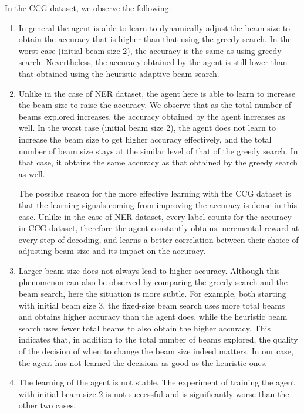 \documentclass[11pt,a4paper]{article}
\begin{document}
In the CCG dataset, we observe the following:
\begin{enumerate}
\item In general the agent is able to learn to dynamically adjust the beam size to obtain the accuracy that is higher than that using the greedy search. In the worst case (initial beam size 2), the accuracy is the same as using greedy search. Nevertheless, the accuracy obtained by the agent is still lower than that obtained using the heuristic adaptive beam search.
\item Unlike in the case of NER dataset, the agent here is able to learn to increase the beam size to raise the accuracy. We observe that as the total number of beams explored increases, the accuracy obtained by the agent increases as well. In the worst case (initial beam size 2), the agent does not learn to increase the beam size to get higher accuracy effectively, and the total number of beam size stays at the similar level of that of the greedy search. In that case, it obtains the same accuracy as that obtained by the greedy search as well.

The possible reason for the more effective learning with the CCG dataset is that the learning signals coming from improving the accuracy is dense in this case. Unlike in the case of NER dataset, every label counts for the accuracy in CCG dataset, therefore the agent constantly obtains incremental reward at every step of decoding, and learns a better correlation between their choice of adjusting beam size and its impact on the accuracy.

\item Larger beam size does not always lead to higher accuracy. Although this phenomenon can also be observed by comparing the greedy search and the beam search, here the situation is more subtle. For example, both starting with initial beam size 3, the fixed-size beam search uses more total beams and obtains higher accuracy than the agent does, while the heuristic beam search uses fewer total beams to also obtain the higher accuracy. This indicates that, in addition to the total number of beams explored, the quality of the decision of when to change the beam size indeed matters. In our case, the agent has not learned the decisions as good as the heuristic ones.

\item The learning of the agent is not stable. The experiment of training the agent with initial beam size 2 is not successful and is significantly worse than the other two cases.
\end{enumerate}
\end{document}
